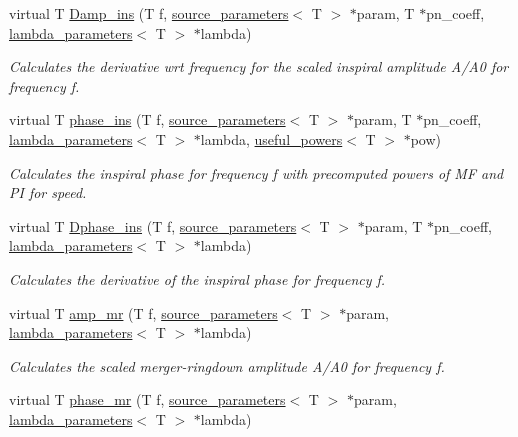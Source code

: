 \begin{DoxyCompactItemize}
virtual T \hyperlink{classIMRPhenomD_a7661208087c747ebfb04b59e17d66d17}{Damp\+\_\+ins} (T f, \hyperlink{structsource__parameters}{source\+\_\+parameters}$<$ T $>$ $\ast$param, T $\ast$pn\+\_\+coeff, \hyperlink{structlambda__parameters}{lambda\+\_\+parameters}$<$ T $>$ $\ast$lambda)
\begin{DoxyCompactList}\small\item\em Calculates the derivative wrt frequency for the scaled inspiral amplitude A/\+A0 for frequency f. \end{DoxyCompactList}\item 
virtual T \hyperlink{classIMRPhenomD_a7073ff2be22b0251ca419d0b69dd9990}{phase\+\_\+ins} (T f, \hyperlink{structsource__parameters}{source\+\_\+parameters}$<$ T $>$ $\ast$param, T $\ast$pn\+\_\+coeff, \hyperlink{structlambda__parameters}{lambda\+\_\+parameters}$<$ T $>$ $\ast$lambda, \hyperlink{structuseful__powers}{useful\+\_\+powers}$<$ T $>$ $\ast$pow)
\begin{DoxyCompactList}\small\item\em Calculates the inspiral phase for frequency f with precomputed powers of MF and PI for speed. \end{DoxyCompactList}\item 
virtual T \hyperlink{classIMRPhenomD_ab840b052576cde8a9e802c5784d24092}{Dphase\+\_\+ins} (T f, \hyperlink{structsource__parameters}{source\+\_\+parameters}$<$ T $>$ $\ast$param, T $\ast$pn\+\_\+coeff, \hyperlink{structlambda__parameters}{lambda\+\_\+parameters}$<$ T $>$ $\ast$lambda)
\begin{DoxyCompactList}\small\item\em Calculates the derivative of the inspiral phase for frequency f. \end{DoxyCompactList}\item 
virtual T \hyperlink{classIMRPhenomD_ad39d45f582ed9089b3783f7340eac615}{amp\+\_\+mr} (T f, \hyperlink{structsource__parameters}{source\+\_\+parameters}$<$ T $>$ $\ast$param, \hyperlink{structlambda__parameters}{lambda\+\_\+parameters}$<$ T $>$ $\ast$lambda)
\begin{DoxyCompactList}\small\item\em Calculates the scaled merger-\/ringdown amplitude A/\+A0 for frequency f. \end{DoxyCompactList}\item 
virtual T \hyperlink{classIMRPhenomD_a2c9c226afc991458872e36bba204f395}{phase\+\_\+mr} (T f, \hyperlink{structsource__parameters}{source\+\_\+parameters}$<$ T $>$ $\ast$param, \hyperlink{structlambda__parameters}{lambda\+\_\+parameters}$<$ T $>$ $\ast$lambda)

\end{DoxyCompactItemize}

